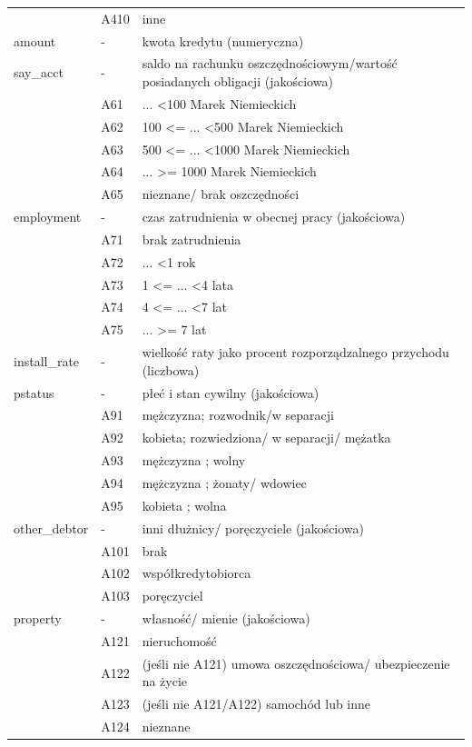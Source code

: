\documentclass[english, twoside, 12pt, a4paper]{article}
\theoremstyle{definition}
\theoremstyle{plain}
\theoremstyle{remark}
\begin{document}
\begin{landscape}
{\begin{longtable}{lll}
 & A410 & inne\\  
amount & - & kwota kredytu (numeryczna)\\  
say\_acct & - & saldo na rachunku oszczędnościowym/wartość posiadanych obligacji (jakościowa)\\  
 & A61 & ... \textless100 Marek Niemieckich\\  
 & A62 & 100 \textless= ... \textless 500 Marek Niemieckich\\  
 & A63 & 500 \textless= ... \textless 1000 Marek Niemieckich\\  
 & A64 & ... \textgreater= 1000 Marek Niemieckich\\  
 & A65 & nieznane/ brak oszczędności\\  
employment & - & czas zatrudnienia w obecnej pracy (jakościowa)\\  
 & A71 & brak zatrudnienia\\  
 & A72 & ... \textless 1 rok\\  
 & A73 & 1 \textless= ... \textless 4 lata\\  
 & A74 & 4 \textless= ... \textless 7 lat\\  
 & A75 & ... \textgreater= 7 lat\\  
install\_rate & - & wielkość raty jako procent rozporządzalnego przychodu (liczbowa)\\  
pstatus & - & płeć i stan cywilny (jakościowa)\\  
 & A91 & mężczyzna; rozwodnik/w separacji\\  
 & A92 & kobieta; rozwiedziona/ w separacji/ mężatka\\  
 & A93 & mężczyzna ; wolny\\  
 & A94 & mężczyzna ; żonaty/ wdowiec\\  
 & A95 & kobieta ; wolna\\  
other\_debtor & - & inni dłużnicy/ poręczyciele (jakościowa)\\  
 & A101 & brak\\  
 & A102 & współkredytobiorca\\  
 & A103 & poręczyciel\\  
property & - & własność/ mienie (jakościowa)\\  
 & A121 & nieruchomość\\  
 & A122 & (jeśli nie A121) umowa oszczędnościowa/ ubezpieczenie na życie\\  
 & A123 & (jeśli nie A121/A122) samochód lub inne\\  
 & A124 & nieznane\\  

\end{longtable}}
\end{landscape}
\end{document}
